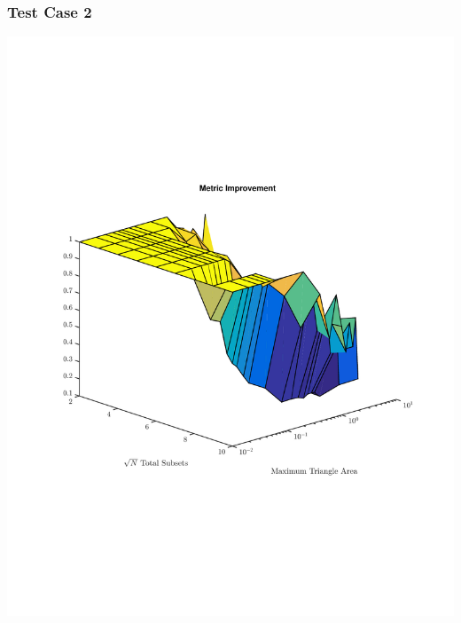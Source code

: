 \documentclass[]{beamer}
\begin{document}
\begin{frame}[t]\frametitle{Test Case 2}
\includegraphics[scale=0.47, trim = 0cm 8cm 0cm 7cm]{figures/SameDiff.pdf}
\end{frame}
\end{document}

